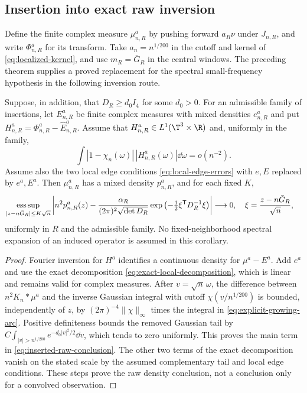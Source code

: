 \subsection{Insertion into exact raw inversion}
Define the finite complex measure $\mu^a_{n,R}$ by pushing forward
$a_R\nu$ under $J_{n,R}$, and write $\Phi^a_{n,R}$ for its transform.
Take $a_n=n^{1/200}$ in the cutoff and kernel of
\eqref{eq:localized-kernel}, and use $m_R=\bar G_R$ in the central
windows. The preceding theorem supplies a proved replacement for the
spectral small-frequency hypothesis in the following inversion route.

\begin{corollary}
\label{cor:raw-from-growing-arc}
Suppose, in addition, that $D_R\ge d_0 I_4$ for some $d_0>0$.
For an admissible family of insertions, let $E^a_{n,R}$ be finite complex
measures with mixed densities $e^a_{n,R}$ and put
$H^a_{n,R}=\Phi^a_{n,R}-\widehat E^a_{n,R}$. Assume that
$H^a_{n,R}\in L^1(\T^3\times\R)$ and, uniformly in the family,
\begin{equation}\label{eq:new-complementary-tail}
 \int |1-\chi_n(\omega)|\,|H^a_{n,R}(\omega)|\dd\omega=o(n^{-2}).
\end{equation}
Assume also the two local edge conditions
\eqref{eq:local-edge-errors} with $e,E$ replaced by $e^a,E^a$.
Then $\mu^a_{n,R}$ has a mixed density $p^a_{n,R}$, and for each fixed
$K$,
\begin{align}
 \mathop{\rm ess\,sup}_{|z-n\bar G_R|\le K\sqrt n}
 \left|n^2p^a_{n,R}(z)
 -\frac{\alpha_R}{(2\pi)^2\sqrt{\det D_R}}
   \exp\left(-\tfrac12\xi^{\mathsf T}D_R^{-1}\xi\right)\right|
 &\longrightarrow0,
 \quad \xi=\frac{z-n\bar G_R}{\sqrt n},
 \label{eq:inserted-raw-conclusion}
\end{align}
uniformly in $R$ and the admissible family. No fixed-neighborhood
spectral expansion of an induced operator is assumed in this corollary.
\end{corollary}
\begin{proof}
Fourier inversion for $H^a$ identifies a continuous density for
$\mu^a-E^a$. Add $e^a$ and use the exact decomposition
\eqref{eq:exact-local-decomposition}, which is linear and remains valid
for complex measures. After $v=\sqrt n\,\omega$, the difference between
$n^2K_n*\mu^a$ and the inverse Gaussian integral with cutoff
$\chi(v/n^{1/200})$ is bounded, independently of $z$, by
$(2\pi)^{-4}\|\chi\|_\infty$ times the integral in
\eqref{eq:explicit-growing-arc}. Positive definiteness bounds the
removed Gaussian tail by
$C\int_{|v|>n^{1/200}}e^{-d_0|v|^2/2}\dd v$, which tends to zero
uniformly. This proves the main term in
\eqref{eq:inserted-raw-conclusion}. The other two terms of the exact
decomposition vanish on the stated scale by the assumed complementary
tail and local edge conditions. These steps prove the raw density
conclusion, not a conclusion only for a convolved observation.
\end{proof}

